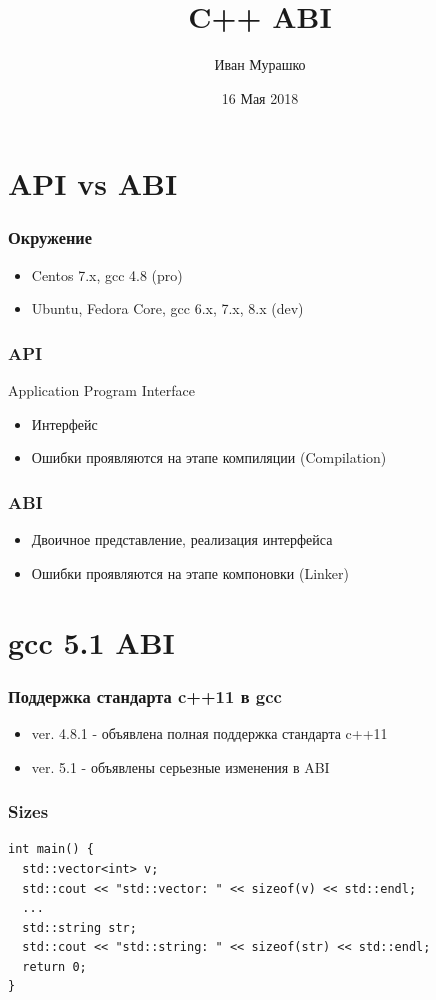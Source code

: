 \documentclass{beamer}
\title[C++ ABI]
    {C++ ABI}
\author{Иван Мурашко}
\date{16 Мая 2018}
\begin{document}
\maketitle

\section{API vs ABI}

\begin{frame}[fragile]
\frametitle{Окружение}
\begin{itemize}
\item Centos 7.x, gcc 4.8 (pro)
\item Ubuntu, Fedora Core, gcc 6.x, 7.x, 8.x (dev)
\end{itemize}
\end{frame}

\begin{frame}[fragile]
\frametitle{API}
Application Program Interface
\begin{itemize}
\item Интерфейс
\item Ошибки проявляются на этапе компиляции (Compilation)
\end{itemize}
\end{frame}

\begin{frame}[fragile]
\frametitle{ABI}
\begin{itemize}
\item Двоичное представление, реализация интерфейса
\item Ошибки проявляются на этапе компоновки (Linker)
\end{itemize}
\end{frame}

\section{gcc 5.1 ABI}

\begin{frame}[fragile]
\frametitle{Поддержка стандарта c++11 в gcc}
\begin{itemize}
\item ver. 4.8.1 - объявлена полная поддержка стандарта c++11
\item ver. 5.1 - объявлены серьезные изменения в ABI
\end{itemize}
\end{frame}

\begin{frame}[fragile]
\frametitle{Sizes}
\begin{verbatim}
int main() {
  std::vector<int> v;
  std::cout << "std::vector: " << sizeof(v) << std::endl;  
  ...
  std::string str;
  std::cout << "std::string: " << sizeof(str) << std::endl;  
  return 0;
}
\end{verbatim}
\end{frame}
\end{document}
